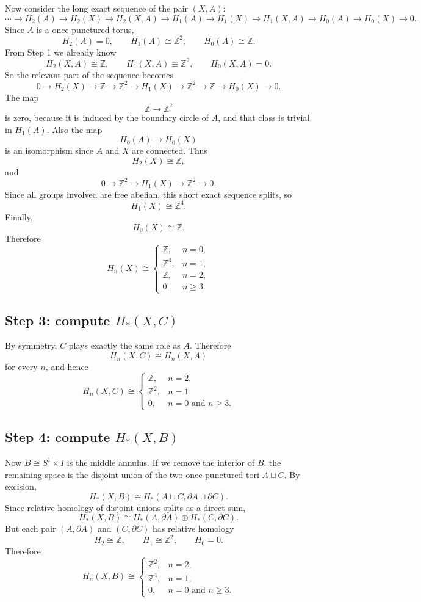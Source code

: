 \documentclass[12pt,a4paper]{article}
\theoremstyle{notespace}
\begin{document}
Now consider the long exact sequence of the pair \((X,A)\):
\[
\cdots\to H_2(A)\to H_2(X)\to H_2(X,A)\to H_1(A)\to H_1(X)\to H_1(X,A)\to H_0(A)\to H_0(X)\to 0.
\]
Since \(A\) is a once-punctured torus,
\[
H_2(A)=0,\qquad
H_1(A)\cong \mathbb Z^2,\qquad
H_0(A)\cong \mathbb Z.
\]
From Step 1 we already know
\[
H_2(X,A)\cong \mathbb Z,\qquad
H_1(X,A)\cong \mathbb Z^2,\qquad
H_0(X,A)=0.
\]
So the relevant part of the sequence becomes
\[
0\to H_2(X)\to \mathbb Z\to \mathbb Z^2\to H_1(X)\to \mathbb Z^2\to \mathbb Z\to H_0(X)\to 0.
\]
The map
\[
\mathbb Z\to \mathbb Z^2
\]
is zero, because it is induced by the boundary circle of \(A\), and that class is trivial in \(H_1(A)\). Also the map
\[
H_0(A)\to H_0(X)
\]
is an isomorphism since \(A\) and \(X\) are connected. Thus
\[
H_2(X)\cong \mathbb Z,
\]
and
\[
0\to \mathbb Z^2\to H_1(X)\to \mathbb Z^2\to 0.
\]
Since all groups involved are free abelian, this short exact sequence splits, so
\[
H_1(X)\cong \mathbb Z^4.
\]
Finally,
\[
H_0(X)\cong \mathbb Z.
\]
Therefore
\[
\boxed{
	H_n(X)\cong
	\begin{cases}
		\mathbb Z, & n=0,\\[1mm]
		\mathbb Z^4, & n=1,\\[1mm]
		\mathbb Z, & n=2,\\[1mm]
		0, & n\ge 3.
	\end{cases}
}
\]

\subsection{Step 3: compute \(H_*(X,C)\)}

By symmetry, \(C\) plays exactly the same role as \(A\). Therefore
\[
H_n(X,C)\cong H_n(X,A)
\]
for every \(n\), and hence
\[
\boxed{
	H_n(X,C)\cong
	\begin{cases}
		\mathbb Z, & n=2,\\[1mm]
		\mathbb Z^2, & n=1,\\[1mm]
		0, & n=0\text{ and }n\ge 3.
	\end{cases}
}
\]

\subsection{Step 4: compute \(H_*(X,B)\)}

Now \(B\cong S^1\times I\) is the middle annulus. If we remove the interior of \(B\), the remaining space is the disjoint union of the two once-punctured tori \(A\sqcup C\). By excision,
\[
H_*(X,B)\cong H_*(A\sqcup C,\partial A\sqcup \partial C).
\]
Since relative homology of disjoint unions splits as a direct sum,
\[
H_*(X,B)\cong H_*(A,\partial A)\oplus H_*(C,\partial C).
\]
But each pair \((A,\partial A)\) and \((C,\partial C)\) has relative homology
\[
H_2\cong \mathbb Z,\qquad
H_1\cong \mathbb Z^2,\qquad
H_0=0.
\]
Therefore
\[
\boxed{
	H_n(X,B)\cong
	\begin{cases}
		\mathbb Z^2, & n=2,\\[1mm]
		\mathbb Z^4, & n=1,\\[1mm]
		0, & n=0\text{ and }n\ge 3.
	\end{cases}
}
\]
\end{document}
